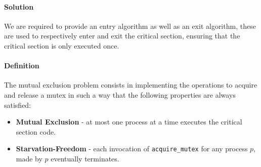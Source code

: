 \paragraph{Solution}
We are required to provide an entry algorithm as well as an exit algorithm,
these are used to respectively enter and exit the critical section,
ensuring that the critical section is only executed once.

\paragraph{Definition}
The mutual exclusion problem consists in implementing the operations to acquire and release a mutex
in such a way that the following properties are always satisfied:

\begin{itemize}
    \item \textbf{Mutual Exclusion} - at most one process at a time executes the critical section code.
    \item \textbf{Starvation-Freedom} - each invocation of \texttt{acquire\_mutex} for any process $p$, made by $p$ eventually terminates.
\end{itemize}